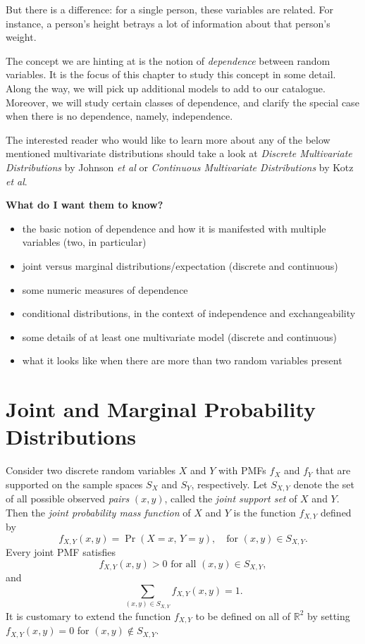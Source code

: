 \documentclass[captions=tableheading]{scrbook}
\begin{document}
But there is a difference: for a single person, these variables are related. For instance, a person's height betrays a lot of information about that person's weight.

The concept we are hinting at is the notion of \emph{dependence} between random variables. It is the focus of this chapter to study this concept in some detail. Along the way, we will pick up additional models to add to our catalogue. Moreover, we will study certain classes of dependence, and clarify the special case when there is no dependence, namely, independence.

The interested reader who would like to learn more about any of the below mentioned multivariate distributions should take a look at \emph{Discrete Multivariate Distributions} by Johnson \emph{et al}\cite{Johnson1997} or \emph{Continuous Multivariate Distributions} \cite{Kotz2000} by Kotz \emph{et al}.

\textbf{What do I want them to know?}
\begin{itemize}
\item the basic notion of dependence and how it is manifested with multiple variables (two, in particular)
\item joint versus marginal distributions/expectation (discrete and continuous)
\item some numeric measures of dependence
\item conditional distributions, in the context of independence and exchangeability
\item some details of at least one multivariate model (discrete and continuous)
\item what it looks like when there are more than two random variables present
\end{itemize}
\section{Joint and Marginal Probability Distributions}
\label{sec-7-1}
\label{sec-Joint-Probability-Distributions}


Consider two discrete random variables \(X\) and \(Y\) with PMFs \(f_{X}\) and \(f_{Y}\) that are supported on the sample spaces \(S_{X}\) and \(S_{Y}\), respectively. Let \(S_{X,Y}\) denote the set of all possible observed \emph{pairs} \((x,y)\), called the \emph{joint support set} of \(X\) and \(Y\). Then the \emph{joint probability mass function} of \(X\) and \(Y\) is the function \(f_{X,Y}\) defined by
\begin{equation}
f_{X,Y}(x,y)=\Pr(X=x,\, Y=y),\quad\mbox{for }(x,y)\in S_{X,Y}.\label{eq-joint-pmf}
\end{equation}
Every joint PMF satisfies
\begin{equation}
f_{X,Y}(x,y)>0\mbox{ for all }(x,y)\in S_{X,Y},
\end{equation}
and
\begin{equation}
\sum_{(x,y)\in S_{X,Y}}f_{X,Y}(x,y)=1.
\end{equation}
It is customary to extend the function \(f_{X,Y}\) to be defined on all of \(\mathbb{R}^{2}\) by setting \(f_{X,Y}(x,y)=0\) for \((x,y)\not\in S_{X,Y}\). 
\end{document}
